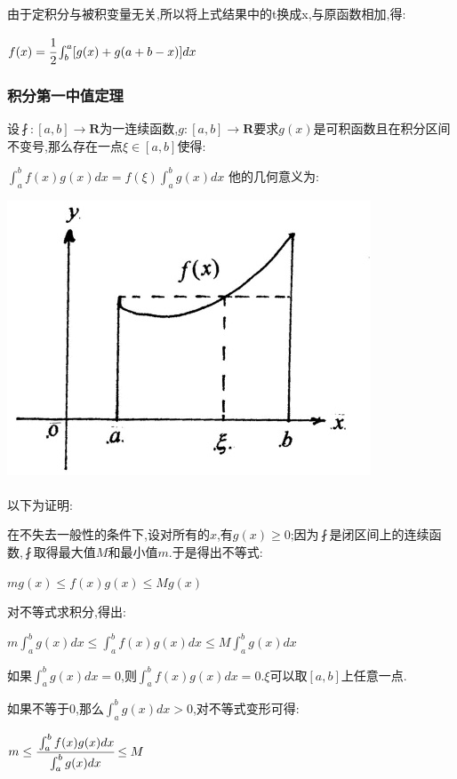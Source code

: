 \documentclass[UTF8,12pt]{ctexbook}
\newcommand{\defFunction}[1]{f(#1)}
\newcommand{\definiteIntegral}[2]{\int^{#1}_{#2}}
\begin{document}
{{{{  由于定积分与被积变量无关,所以将上式结果中的t换成x,与原函数相加,得:

  $\defFunction{x} = \cfrac{1}{2}\definiteIntegral{a}{b}[g(x) + g(a + b - x)]dx$
}%

\subsubsection{积分第一中值定理}{
设$\fint:[a,b] \to \mathbf{R}$为一连续函数,$g:[a,b] \to \mathbf{R}$要求$g(x)$是可积函数且在积分区间不变号,那么存在一点$\xi\in[a,b]$使得:

$\definiteIntegral{b}{a}\defFunction{x}g(x)dx = \defFunction{\xi}\definiteIntegral{b}{a}g(x)dx$
他的几何意义为:

\includegraphics{resources/Geometric_explanation_of_the_mean_value_theorem_for_integration.jpg}
\\\\
以下为证明:

在不失去一般性的条件下,设对所有的$x$,有$g(x) \geq 0$;因为$\fint$是闭区间上的连续函数,$\fint$取得最大值$M$和最小值$m$.于是得出不等式:

$mg(x) \leq \defFunction{x}g(x) \leq Mg(x)$

对不等式求积分,得出:

$m\definiteIntegral{b}{a}g(x)dx \leq \definiteIntegral{b}{a}\defFunction{x}g(x)dx \leq M\definiteIntegral{b}{a}g(x)dx$

如果$\definiteIntegral{b}{a}g(x)dx = 0$,则$\definiteIntegral{b}{a}\defFunction{x}g(x)dx = 0$.$\xi$可以取$[a,b]$上任意一点.

如果不等于$0$,那么$\definiteIntegral{b}{a}g(x)dx>0$,对不等式变形可得:

$m \leq \cfrac{\definiteIntegral{b}{a}\defFunction{x}g(x)dx}{\definiteIntegral{b}{a}g(x)dx} \leq M$

}}}}
\end{document}
